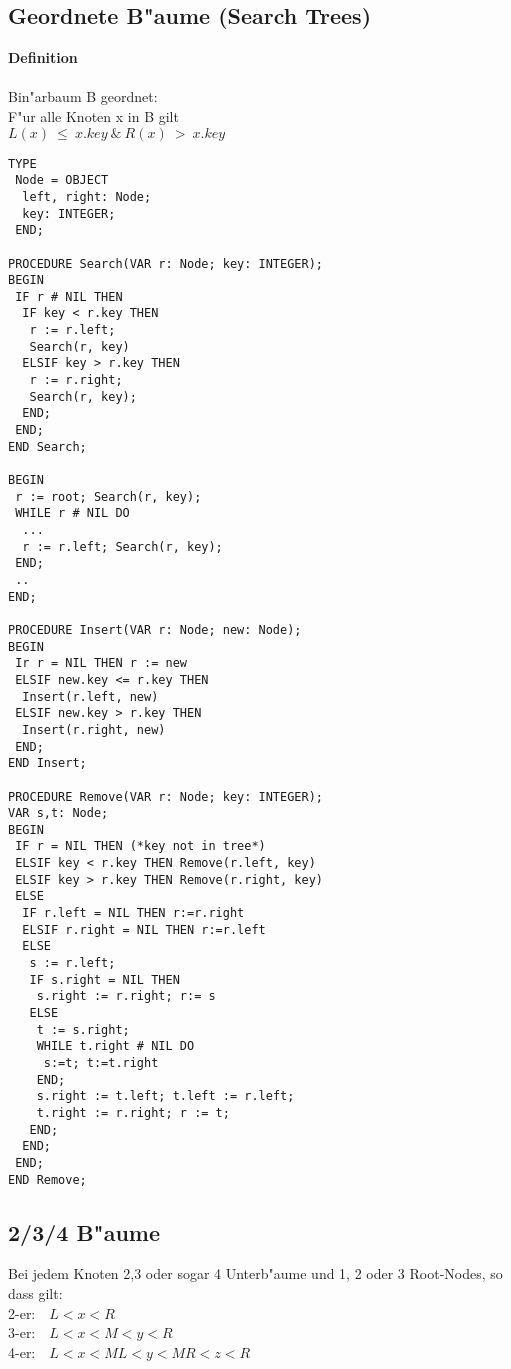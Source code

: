 \documentclass[10pt, a4paper, twocolumn]{scrartcl}
\begin{document}
\subsection{Geordnete B"aume (Search Trees)}

{\bf Definition}\\\\
Bin"arbaum B geordnet:\\
F"ur alle Knoten x in B gilt\\
$L(x)\:\leq\:x.key\:\&\:R(x)\:>\:x.key$\\

\begin{verbatim}
TYPE
 Node = OBJECT
  left, right: Node;
  key: INTEGER;
 END;

PROCEDURE Search(VAR r: Node; key: INTEGER);
BEGIN
 IF r # NIL THEN
  IF key < r.key THEN 
   r := r.left;
   Search(r, key)
  ELSIF key > r.key THEN
   r := r.right;
   Search(r, key);
  END;
 END;
END Search;

BEGIN
 r := root; Search(r, key);
 WHILE r # NIL DO
  ...
  r := r.left; Search(r, key);
 END;
 ..
END;

PROCEDURE Insert(VAR r: Node; new: Node);
BEGIN
 Ir r = NIL THEN r := new
 ELSIF new.key <= r.key THEN 
  Insert(r.left, new)
 ELSIF new.key > r.key THEN 
  Insert(r.right, new)
 END;
END Insert;

PROCEDURE Remove(VAR r: Node; key: INTEGER);
VAR s,t: Node;
BEGIN
 IF r = NIL THEN (*key not in tree*)
 ELSIF key < r.key THEN Remove(r.left, key)
 ELSIF key > r.key THEN Remove(r.right, key)
 ELSE
  IF r.left = NIL THEN r:=r.right
  ELSIF r.right = NIL THEN r:=r.left
  ELSE
   s := r.left;
   IF s.right = NIL THEN
    s.right := r.right; r:= s
   ELSE
    t := s.right;
    WHILE t.right # NIL DO 
     s:=t; t:=t.right
    END;
    s.right := t.left; t.left := r.left;
    t.right := r.right; r := t;
   END;
  END;
 END;
END Remove;
\end{verbatim}

\subsection{2/3/4 B"aume}

Bei jedem Knoten 2,3 oder sogar 4 Unterb"aume und 1, 2 oder 3 Root-Nodes, so dass gilt:\\
2-er:\ \ $L<x<R$\\
3-er:\ \ $L<x<M<y<R$\\
4-er:\ \ $L<x<ML<y<MR<z<R$\\\\
\end{document}
